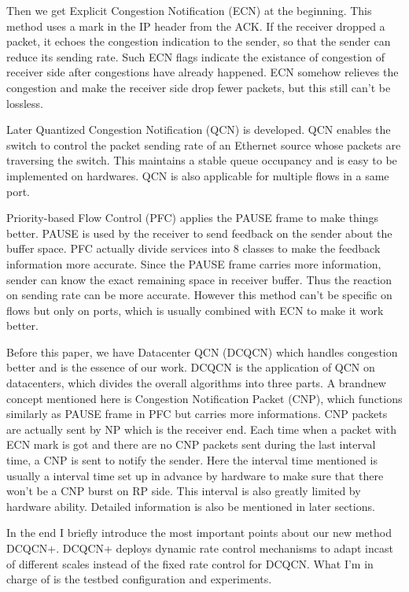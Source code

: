 \documentclass[12pt,a4paper]{article}
\begin{document}
Then we get Explicit Congestion Notification (ECN) at the beginning.
This method uses a mark in the IP header from the ACK.
If the receiver dropped a packet, it echoes the congestion indication to the sender, so that the sender can reduce its sending rate.
Such ECN flags indicate the existance of congestion of receiver side after congestions have already happened.
ECN somehow relieves the congestion and make the receiver side drop fewer packets, but this still can't be lossless.

Later Quantized Congestion Notification (QCN) is developed.
QCN enables the switch to control the packet sending rate of an Ethernet source whose packets are traversing the switch.
This maintains a stable queue occupancy and is easy to be implemented on hardwares.
QCN is also applicable for multiple flows in a same port.

Priority-based Flow Control (PFC) applies the PAUSE frame to make things better.
PAUSE is used by the receiver to send feedback on the sender about the buffer space.
PFC actually divide services into 8 classes to make the feedback information more accurate.
Since the PAUSE frame carries more information, sender can know the exact remaining space in receiver buffer.
Thus the reaction on sending rate can be more accurate.
However this method can't be specific on flows but only on ports, which is usually combined with ECN to make it work better.

Before this paper, we have Datacenter QCN (DCQCN) which handles congestion better and is the essence of our work.
DCQCN is the application of QCN on datacenters, which divides the overall algorithms into three parts.
A brandnew concept mentioned here is Congestion Notification Packet (CNP), which functions similarly as PAUSE frame in PFC but carries more informations.
CNP packets are actually sent by NP which is the receiver end.
Each time when a packet with ECN mark is got and there are no CNP packets sent during the last interval time, a CNP is sent to notify the
sender.
Here the interval time mentioned is usually a interval time set up in advance by hardware to make sure that there won't be a CNP burst on
RP side.
This interval is also greatly limited by hardware ability.
Detailed information is also be mentioned in later sections.

In the end I briefly introduce the most important points about our new method DCQCN+.
DCQCN+ deploys dynamic rate control mechanisms to adapt incast of different scales instead of the fixed rate control for DCQCN.
What I'm in charge of is the testbed configuration and experiments.
\end{document}
